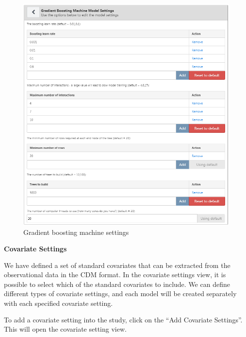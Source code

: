 \documentclass[11pt]{book}
\theoremstyle{definition}
\theoremstyle{definition}
\theoremstyle{definition}
\theoremstyle{remark}
\begin{document}
\begin{figure}

{\centering \includegraphics[width=1\linewidth]{images/PatientLevelPrediction/gbmSettings} 

}

\caption{Gradient boosting machine settings}\label{fig:gbmSettings}
\end{figure}

\textbf{Covariate Settings}

We have defined a set of standard covariates that can be extracted from the observational data in the CDM format. In the covariate settings view, it is possible to select which of the standard covariates to include. We can define different types of covariate settings, and each model will be created separately with each specified covariate setting.

To add a covariate setting into the study, click on the ``Add Covariate Settings''. This will open the covariate setting view.
\end{document}
